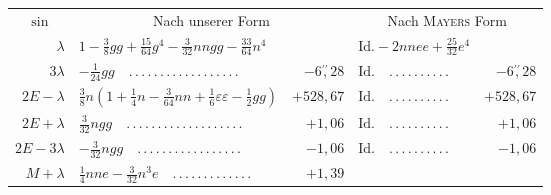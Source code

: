 \begin{landscape}
\begingroup\small
\setlength{\tabcolsep}{3pt}
\renewcommand{\arraystretch}{1.15}
\begin{longtable}{r|p{7.8cm}r@{\quad}p{4.3cm}r}
\multicolumn{1}{c}{\(\sin\)}&\multicolumn{2}{c}{Nach unserer Form}&
\multicolumn{2}{c}{Nach \textsc{Mayers} Form}\\
\(\lambda\)&\(1-\tfrac38gg+\tfrac{15}{64}g^4-\tfrac{3}{32}nngg-\tfrac{33}{64}n^4\)&
&\(\text{Id.}-2nnee+\tfrac{25}{32}e^4\)&\\
\(3\lambda\)&\(-\tfrac{1}{24}gg\quad \mathord{.}\,\mathord{.}\,\mathord{.}\,\mathord{.}\,\mathord{.}\,\mathord{.}\,\mathord{.}\,\mathord{.}\,\mathord{.}\,\mathord{.}\,\mathord{.}\,\mathord{.}\,\mathord{.}\,\mathord{.}\,\mathord{.}\,\mathord{.}\,\mathord{.}\,\mathord{.}\)&\(-6\overset{\prime\prime}{,}28\)
&\(\text{Id.}\quad \mathord{.}\,\mathord{.}\,\mathord{.}\,\mathord{.}\,\mathord{.}\,\mathord{.}\,\mathord{.}\,\mathord{.}\,\mathord{.}\,\mathord{.}\)&\(-6\overset{\prime\prime}{,}28\)\\
\(2E-\lambda\)&\(\tfrac38n(1+\tfrac14n-\tfrac{3}{64}nn+\tfrac16\varepsilon\varepsilon-\tfrac12gg)\)&\(+528{,}67\)
&\(\text{Id.}\quad \mathord{.}\,\mathord{.}\,\mathord{.}\,\mathord{.}\,\mathord{.}\,\mathord{.}\,\mathord{.}\,\mathord{.}\,\mathord{.}\,\mathord{.}\)&\(+528{,}67\)\\
\(2E+\lambda\)&\(\tfrac{3}{32}ngg\quad \mathord{.}\,\mathord{.}\,\mathord{.}\,\mathord{.}\,\mathord{.}\,\mathord{.}\,\mathord{.}\,\mathord{.}\,\mathord{.}\,\mathord{.}\,\mathord{.}\,\mathord{.}\,\mathord{.}\,\mathord{.}\,\mathord{.}\,\mathord{.}\,\mathord{.}\,\mathord{.}\,\mathord{.}\)&\(+1{,}06\)
&\(\text{Id.}\quad \mathord{.}\,\mathord{.}\,\mathord{.}\,\mathord{.}\,\mathord{.}\,\mathord{.}\,\mathord{.}\,\mathord{.}\,\mathord{.}\,\mathord{.}\)&\(+1{,}06\)\\
\(2E-3\lambda\)&\(-\tfrac{3}{32}ngg\quad \mathord{.}\,\mathord{.}\,\mathord{.}\,\mathord{.}\,\mathord{.}\,\mathord{.}\,\mathord{.}\,\mathord{.}\,\mathord{.}\,\mathord{.}\,\mathord{.}\,\mathord{.}\,\mathord{.}\,\mathord{.}\,\mathord{.}\,\mathord{.}\,\mathord{.}\)&\(-1{,}06\)
&\(\text{Id.}\quad \mathord{.}\,\mathord{.}\,\mathord{.}\,\mathord{.}\,\mathord{.}\,\mathord{.}\,\mathord{.}\,\mathord{.}\,\mathord{.}\,\mathord{.}\)&\(-1{,}06\)\\
\(M+\lambda\)&\(\tfrac14nne-\tfrac{3}{32}n^3e\quad \mathord{.}\,\mathord{.}\,\mathord{.}\,\mathord{.}\,\mathord{.}\,\mathord{.}\,\mathord{.}\,\mathord{.}\,\mathord{.}\,\mathord{.}\,\mathord{.}\,\mathord{.}\,\mathord{.}\)&\(+1{,}39\)

\end{longtable}
\end{landscape}
